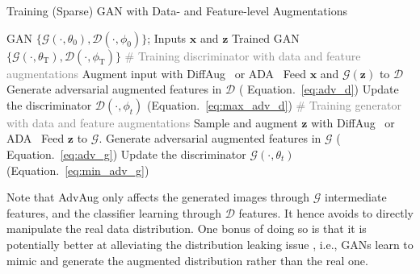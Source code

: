 \documentclass{article}
\begin{document}
\begin{algorithm}[!ht]
\caption{Training (Sparse) GAN with Data- and Feature-level Augmentations}
\label{alg:AdvAug}
\begin{algorithmic}
     GAN $\{\mathcal{G}(\cdot,\theta_0),\mathcal{D}(\cdot,\phi_0)\}$; Inputs $\boldsymbol{x}$ and $\boldsymbol{z}$
     Trained GAN $\{\mathcal{G}(\cdot,\theta_\mathrm{T}),\mathcal{D}(\cdot,\phi_\mathrm{T})\}$
        \STATE \textcolor{gray}{\# Training discriminator with data and feature augmentations} 
        \STATE Augment input with DiffAug~\citep{zhao2020diffaugment} or ADA~\citep{karras2020training}
        \STATE Feed $\boldsymbol{x}$ and $\mathcal{G}(\boldsymbol{z})$ to $\mathcal{D}$
        \STATE Generate adversarial augmented features in $\mathcal{D}$ ( Equation.~\ref{eq:adv_d})
        \STATE Update the discriminator $\mathcal{D}(\cdot,\phi_t)$ (Equation.~\ref{eq:max_adv_d})
        \STATE \textcolor{gray}{\# Training generator with data and feature augmentations}
        \STATE Sample and augment $\boldsymbol{z}$ with DiffAug~\citep{zhao2020diffaugment} or ADA~\citep{karras2020training}
        \STATE Feed $\boldsymbol{z}$ to $\mathcal{G}$. Generate adversarial augmented features in $\mathcal{G}$ ( Equation.~\ref{eq:adv_g})
        \STATE Update the discriminator $\mathcal{G}(\cdot,\theta_t)$ (Equation.~\ref{eq:min_adv_g})
    \ENDFOR
\end{algorithmic}
\end{algorithm}

Note that AdvAug only affects the generated images through $\mathcal{G}$ intermediate features, and the classifier learning through $\mathcal{D}$ features. It hence avoids to directly manipulate the real data distribution. One bonus of doing so is that it is potentially better at alleviating the distribution leaking issue \cite{karras2020training}, i.e., GANs learn to mimic and generate the augmented distribution rather than the real one.


\end{document}

